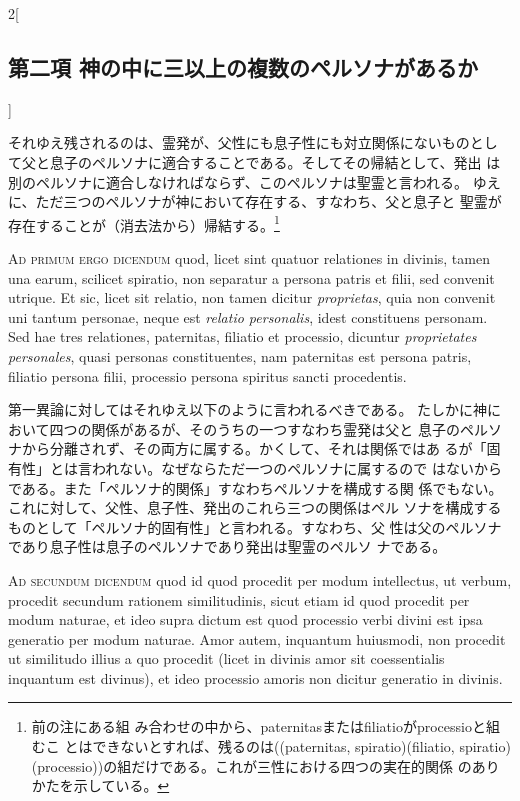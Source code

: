 \documentclass[paper=a4paper,fontsize=10pt,jafontsize=9pt,titlepage]{jlreq}
\begin{document}
\begin{paracol}{2}[\subsection{第二項 神の中に三以上の複数のペルソナがあるか}]
\switchcolumn


それゆえ残されるのは、霊発が、父性にも息子性にも対立関係にないものとし
 て父と息子のペルソナに適合することである。そしてその帰結として、発出
 は別のペルソナに適合しなければならず、このペルソナは聖霊と言われる。
 ゆえに、ただ三つのペルソナが神において存在する、すなわち、父と息子と
 聖霊が存在することが（消去法から）帰結する。\footnote{前の注にある組
 み合わせの中から、paternitasまたはfiliatioがprocessioと組むこ
 とはできないとすれば、残るのは((paternitas, spiratio)(filiatio,
 spiratio)(processio))の組だけである。これが三性における四つの実在的関係
 のありかたを示している。}


\switchcolumn*[\subsection{ad.1}]


{\scshape Ad primum ergo dicendum} quod, licet sint quatuor relationes in
divinis, tamen una earum, scilicet spiratio, non separatur a persona
patris et filii, sed convenit utrique. Et sic, licet sit relatio, non
tamen dicitur {\itshape proprietas}, quia non convenit uni tantum personae, neque
est {\itshape relatio personalis}, idest constituens personam. Sed hae tres
relationes, paternitas, filiatio et processio, dicuntur {\itshape proprietates
personales}, quasi personas constituentes, nam paternitas est persona
patris, filiatio persona filii, processio persona spiritus sancti
procedentis.


\switchcolumn


第一異論に対してはそれゆえ以下のように言われるべきである。
たしかに神において四つの関係があるが、そのうちの一つすなわち霊発は父と
 息子のペルソナから分離されず、その両方に属する。かくして、それは関係ではあ
 るが「固有性」とは言われない。なぜならただ一つのペルソナに属するので
 はないからである。また「ペルソナ的関係」すなわちペルソナを構成する関
 係でもない。これに対して、父性、息子性、発出のこれら三つの関係はペル
 ソナを構成するものとして「ペルソナ的固有性」と言われる。すなわち、父
 性は父のペルソナであり息子性は息子のペルソナであり発出は聖霊のペルソ
 ナである。


\switchcolumn*[\subsection{ad.2}]


{\scshape Ad secundum dicendum} quod id quod procedit per modum intellectus, ut
verbum, procedit secundum rationem similitudinis, sicut etiam id quod
procedit per modum naturae, et ideo supra dictum est quod processio
verbi divini est ipsa generatio per modum naturae. Amor autem,
inquantum huiusmodi, non procedit ut similitudo illius a quo procedit
(licet in divinis amor sit coessentialis inquantum est divinus), et
ideo processio amoris non dicitur generatio in divinis.



\end{paracol}
\end{document}
